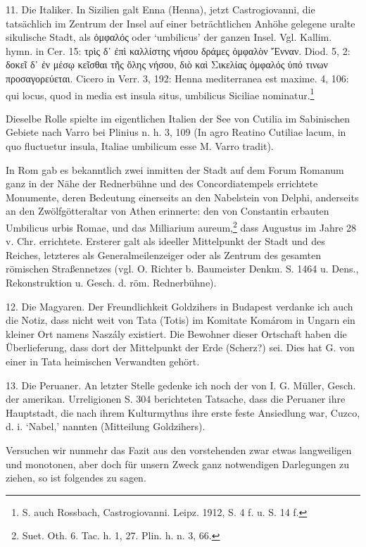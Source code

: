 \documentclass[a4paper, 11pt, oneside]{article}
\begin{document}
11. Die Italiker. In Sizilien galt Enna (Henna), jetzt Castrogiovanni, die tatsächlich im Zentrum der Insel auf einer beträchtlichen Anhöhe gelegene uralte sikulische Stadt, als ὀμφαλός oder `umbilicus' der ganzen Insel. Vgl. Kallim. hymn. in Cer. 15: τρὶς δ᾽ ἐπὶ καλλίστης νήσου δράμες ὀμφαλὸν Ἔνναν. Diod. 5, 2: δοκεῖ δ᾽ ἐν μέσῳ κεῖσθαι τῆς ὅλης νήσου, διὸ καὶ Σικελίας ὀμφαλός ὑπό τινων προσαγορεύεται. Cicero in Verr. 3, 192: Henna mediterranea est maxime. 4, 106: qui locus, quod in media est insula situs, umbilicus Siciliae nominatur.\footnote{S. auch Rossbach, Castrogiovanni. Leipz. 1912, S. 4 f. u. S. 14 f.}

Dieselbe Rolle spielte im eigentlichen Italien der See von Cutilia im Sabinischen Gebiete nach Varro bei Plinius n. h. 3, 109 (In agro Reatino Cutiliae lacum, in quo fluctuetur insula, Italiae umbilicum esse M. Varro tradit).

In Rom gab es bekanntlich zwei inmitten der Stadt auf dem Forum Romanum ganz in der Nähe der Rednerbühne und des Concordiatempels errichtete Monumente, deren Bedeutung einerseits an den Nabelstein von Delphi, anderseits an den Zwölfgötteraltar von Athen erinnerte: den von Constantin erbauten Umbilicus urbis Romae, und das Milliarium aureum,\footnote{Suet. Oth. 6. Tac. h. 1, 27. Plin. h. n. 3, 66.} dass Augustus im Jahre 28 v. Chr. errichtete. Ersterer galt als ideeller Mittelpunkt der Stadt und des Reiches, letzteres als Generalmeilenzeiger oder als Zentrum des gesamten römischen Straßennetzes (vgl. O. Richter b. Baumeister Denkm. S. 1464 u. Dens., Rekonstruktion u. Gesch. d. röm. Rednerbühne).

12. Die Magyaren. Der Freundlichkeit Goldzihers in Budapest verdanke ich auch die Notiz, dass nicht weit von Tata (Totis) im Komitate Komárom in Ungarn ein kleiner Ort namens Naszály existiert. Die Bewohner dieser Ortschaft haben die Überlieferung, dass dort der Mittelpunkt der Erde (Scherz?) sei. Dies hat G. von einer in Tata heimischen Verwandten gehört.

13. Die Peruaner. An letzter Stelle gedenke ich noch der von I. G. Müller, Gesch. der amerikan. Urreligionen S. 304 berichteten Tatsache, dass die Peruaner ihre Hauptstadt, die nach ihrem Kulturmythus ihre erste feste Ansiedlung war, Cuzco, d. i. `Nabel,' nannten (Mitteilung Goldzihers).

Versuchen wir nunmehr das Fazit aus den vorstehenden zwar etwas langweiligen und monotonen, aber doch für unsern Zweck ganz notwendigen Darlegungen zu ziehen, so ist folgendes zu sagen.
\end{document}
